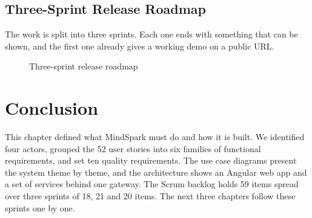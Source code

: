 \documentclass[12pt,a4paper]{report}
\begin{document}
\subsection{Three-Sprint Release Roadmap}
\label{subsec:roadmap}

The work is split into three sprints. Each one ends with something that can be shown, and the first one already gives a working demo on a public URL.

\begin{figure}[htbp]
\centering
{}
\caption{Three-sprint release roadmap}
\label{fig:roadmap}
\end{figure}


\section{Conclusion}
\label{sec:req-conclusion}

This chapter defined what MindSpark must do and how it is built. We identified four actors, grouped the 52 user stories into six families of functional requirements, and set ten quality requirements. The use case diagrams present the system theme by theme, and the architecture shows an Angular web app and a set of services behind one gateway. The Scrum backlog holds 59 items spread over three sprints of 18, 21 and 20 items. The next three chapters follow these sprints one by one.
\end{document}
